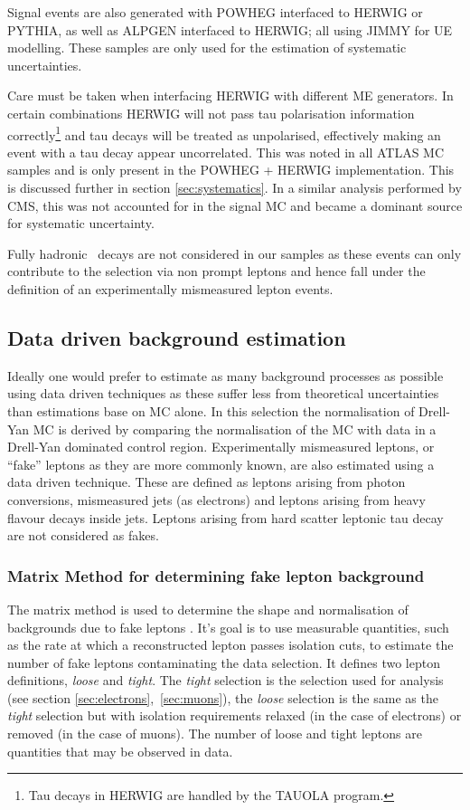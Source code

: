 Signal events are also generated with POWHEG interfaced to HERWIG or PYTHIA, as well as ALPGEN interfaced to HERWIG; all using JIMMY for UE modelling. These samples are only used for the estimation of systematic uncertainties.

Care must be taken when interfacing HERWIG with different ME generators. In certain combinations HERWIG will not pass tau polarisation information correctly\footnote{Tau decays in HERWIG are handled by the TAUOLA program.} and tau decays will be treated as unpolarised, effectively making an event with a tau decay appear uncorrelated. This was noted in all ATLAS MC samples and is only present in the POWHEG + HERWIG implementation. This is discussed further in section \ref{sec:systematics}. In a similar analysis performed by CMS, this was not accounted for in the signal MC and became a dominant source for systematic uncertainty.  

Fully hadronic \ttbar\ decays are not considered in our samples as these events can only contribute to the selection via non prompt leptons and hence fall under the definition of an experimentally mismeasured lepton events. 

\subsection{Data driven background estimation}

Ideally one would prefer to estimate as many background processes as possible using data driven techniques as these suffer less from theoretical uncertainties than estimations base on MC alone. In this selection the normalisation of Drell-Yan MC is derived by comparing the normalisation of the MC with data in a Drell-Yan dominated control region. Experimentally mismeasured leptons, or ``fake'' leptons as they are more commonly known, are also estimated using a data driven technique. These are defined as leptons arising from photon conversions, mismeasured jets (as electrons) and leptons arising from heavy flavour decays inside jets. Leptons arising from hard scatter leptonic tau decay are not considered as fakes. 

\subsubsection*{Matrix Method for determining fake lepton background}

The matrix method is used to determine the shape and normalisation of backgrounds due to fake leptons \cite{fakes}\cite{topwg}. It's goal is to use measurable quantities, such as the rate at which a reconstructed lepton passes isolation cuts, to estimate the number of fake leptons contaminating the data selection. It defines two lepton definitions, \emph{loose} and \emph{tight}. The \emph{tight} selection is the selection used for analysis (see section \ref{sec:electrons},~\ref{sec:muons}), the \emph{loose} selection is the same as the \emph{tight} selection but with isolation requirements relaxed (in the case of electrons) or removed (in the case of muons). The number of loose and tight leptons are quantities that may be observed in data.

